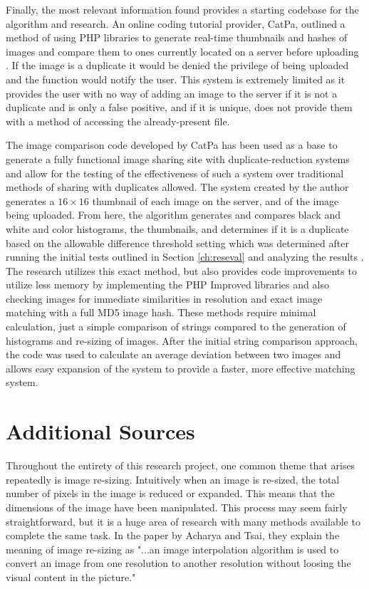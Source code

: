 Finally, the most relevant information found provides a starting codebase for the algorithm and research. An online coding tutorial provider, CatPa, outlined a method of using PHP libraries to generate real-time thumbnails and hashes of images and compare them to ones currently located on a server before uploading \cite{catpa:gdcode}. If the image is a duplicate it would be denied the privilege of being uploaded and the function would notify the user. This system is extremely limited as it provides the user with no way of adding an image to the server if it is not a duplicate and is only a false positive, and if it is unique, does not provide them with a method of accessing the already-present file.

The image comparison code developed by CatPa has been used as a base to generate a fully functional image sharing site with duplicate-reduction systems and allow for the testing of the effectiveness of such a system over traditional methods of sharing with duplicates allowed. The system created by the author \cite{catpa:gdcode} generates a $16\times 16$ thumbnail of each image on the server, and of the image being uploaded. From here, the algorithm generates and compares black and white and color histograms, the thumbnails, and determines if it is a duplicate based on the allowable difference threshold setting which was determined after running the initial tests outlined in Section \ref{ch:reseval} and analyzing the results \cite{catpa:gdcode}. The research utilizes this exact method, but also provides code improvements to utilize less memory by implementing the PHP Improved libraries and also checking images for immediate similarities in resolution and exact image matching with a full MD5 image hash. These methods require minimal calculation, just a simple comparison of strings compared to the generation of histograms and re-sizing of images. After the initial string comparison approach, the code was used to calculate an average deviation between two images and allows easy expansion of the system to provide a faster, more effective matching system.

\section{Additional Sources}
Throughout the entirety of this research project, one common theme that arises repeatedly is image re-sizing. Intuitively when an image is re-sized, the total number of pixels in the image is reduced or expanded. This means that the dimensions of the image have been manipulated. This process may seem fairly straightforward, but it is a huge area of research with many methods available to complete the same task. In the paper by Acharya and Tsai, they explain the meaning of image re-sizing as "...an image interpolation algorithm is used to convert an image from one resolution to another resolution without loosing the visual content in the picture." \cite{Acharya:2007}

